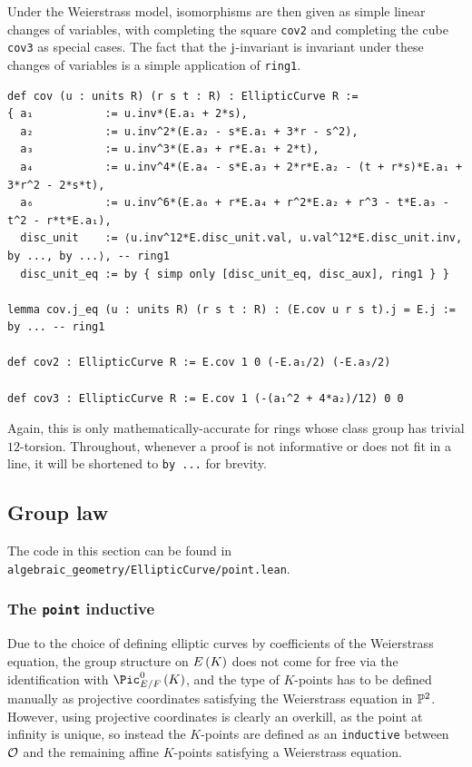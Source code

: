 Under the Weierstrass model, isomorphisms are then given as simple linear changes of variables, with completing the square \texttt{cov2} and completing the cube \texttt{cov3} as special cases. The fact that the $ \mathrm{j} $-invariant is invariant under these changes of variables is a simple application of \texttt{ring1}.

\begin{lstlisting}[frame=single]
def cov (u : units R) (r s t : R) : EllipticCurve R :=
{ a₁           := u.inv*(E.a₁ + 2*s),
  a₂           := u.inv^2*(E.a₂ - s*E.a₁ + 3*r - s^2),
  a₃           := u.inv^3*(E.a₃ + r*E.a₁ + 2*t),
  a₄           := u.inv^4*(E.a₄ - s*E.a₃ + 2*r*E.a₂ - (t + r*s)*E.a₁ + 3*r^2 - 2*s*t),
  a₆           := u.inv^6*(E.a₆ + r*E.a₄ + r^2*E.a₂ + r^3 - t*E.a₃ - t^2 - r*t*E.a₁),
  disc_unit    := ⟨u.inv^12*E.disc_unit.val, u.val^12*E.disc_unit.inv, by ..., by ...⟩, -- ring1
  disc_unit_eq := by { simp only [disc_unit_eq, disc_aux], ring1 } }

lemma cov.j_eq (u : units R) (r s t : R) : (E.cov u r s t).j = E.j := by ... -- ring1

def cov2 : EllipticCurve R := E.cov 1 0 (-E.a₁/2) (-E.a₃/2)

def cov3 : EllipticCurve R := E.cov 1 (-(a₁^2 + 4*a₂)/12) 0 0
\end{lstlisting}

Again, this is only mathematically-accurate for rings whose class group has trivial $ 12 $-torsion. Throughout, whenever a proof is not informative or does not fit in a line, it will be shortened to \texttt{by ...} for brevity.

\pagebreak

\subsection{Group law}

The code in this section can be found in \texttt{algebraic\_geometry/EllipticCurve/point.lean}.

\subsubsection{The \texttt{point} inductive}

Due to the choice of defining elliptic curves by coefficients of the Weierstrass equation, the group structure on $ E\br{K} $ does not come for free via the identification with $ \Pic_{E / F}^0\br{K} $, and the type of $ K $-points has to be defined manually as projective coordinates satisfying the Weierstrass equation in $ \mathbb{P}^2 $. However, using projective coordinates is clearly an overkill, as the point at infinity is unique, so instead the $ K $-points are defined as an \texttt{inductive} between $ \mathcal{O} $ and the remaining affine $ K $-points satisfying a Weierstrass equation.

